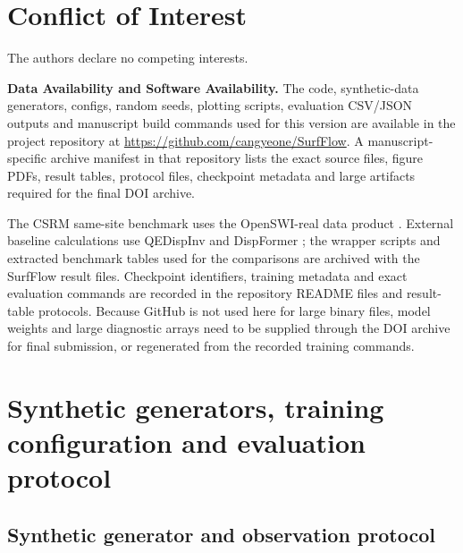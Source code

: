 \documentclass[referee]{gji}
\begin{document}
\section*{Conflict of Interest}

The authors declare no competing interests.

\begin{dataavailability}
\noindent\textbf{Data Availability and Software Availability.}
The code, synthetic-data generators, configs, random seeds, plotting scripts, evaluation CSV/JSON outputs and manuscript build commands used for this version are available in the project repository at \url{https://github.com/cangyeone/SurfFlow}. A manuscript-specific archive manifest in that repository lists the exact source files, figure PDFs, result tables, protocol files, checkpoint metadata and large artifacts required for the final DOI archive.

The CSRM same-site benchmark uses the OpenSWI-real data product \citep{LiuEtAl2026OpenSWI}. External baseline calculations use QEDispInv \citep{PanEtAl2026QEDispInv} and DispFormer \citep{LiuEtAl2025DispFormer}; the wrapper scripts and extracted benchmark tables used for the comparisons are archived with the SurfFlow result files. Checkpoint identifiers, training metadata and exact evaluation commands are recorded in the repository README files and result-table protocols. Because GitHub is not used here for large binary files, model weights and large diagnostic arrays need to be supplied through the DOI archive for final submission, or regenerated from the recorded training commands.
\end{dataavailability}

\clearpage




\appendix
\setcounter{table}{0}
\renewcommand{\thetable}{A\arabic{table}}
\renewcommand{\theHtable}{A\arabic{table}}
\setcounter{figure}{0}
\renewcommand{\thefigure}{A\arabic{figure}}
\renewcommand{\theHfigure}{A\arabic{figure}}

\section{Synthetic generators, training configuration and evaluation protocol}

\subsection{Synthetic generator and observation protocol}
\end{document}

